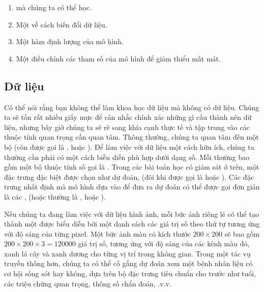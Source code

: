 \documentclass[letterpaper,11pt,english]{sphinxmanual}
\begin{document}
\begin{enumerate}
%
\item {} 
 mà chúng ta có thể học.

\item {} 
Một  về cách biến đổi dữ liệu.

\item {} 
Một hàm  định lượng  của mô hình.

\item {} 
Một  điều chỉnh các tham số của mô hình để giảm thiểu mất
mát.

\end{enumerate}




\subsection{Dữ liệu}
\label{\detokenize{chapter_introduction/index_vn:du-lieu}}


Có thể nói rằng bạn không thể làm khoa học dữ liệu mà không có dữ liệu.
Chúng ta sẽ tốn rất nhiều giấy mực để cân nhắc chính xác những gì cấu
thành nên dữ liệu, nhưng bây giờ chúng ta sẽ rẽ sang khía cạnh thực tế
và tập trung vào các thuộc tính quan trọng cần quan tâm. Thông thường,
chúng ta quan tâm đến một bộ  (còn được gọi là ,  hoặc ). Để làm việc với dữ liệu một cách hữu ích, chúng
ta thường cần phải có một cách biễu diễn phù hợp dưới dạng số. Mỗi  thường bao gồm một bộ thuộc tính số gọi là . Trong các
bài toán học có giám sát ở trên, một đặc trưng đặc biệt được chọn như
 dự đoán, (đôi khi được gọi là  hoặc ).
Các đặc trưng nhất định mà mô hình dựa vào để đưa ra dự đoán có thể được
gọi đơn giản là các , (hoặc thường là , 
hoặc ).



Nếu chúng ta đang làm việc với dữ liệu hình ảnh, mỗi bức ảnh riêng lẻ có
thể tạo thành một  được biểu diễn bởi một danh sách các giá trị số
theo thứ tự tương ứng với độ sáng của từng pixel. Một bức ảnh màu có
kích thước \(200\times 200\) sẽ bao gồm
\(200\times200\times3=120000\) giá trị số, tương ứng với độ sáng của
các kênh màu đỏ, xanh lá cây và xanh dương cho từng vị trí trong không
gian. Trong một tác vụ truyền thống hơn, chúng ta có thể cố gắng dự đoán
xem một bệnh nhân liệu có cơ hội sống sót hay không, dựa trên bộ đặc
trưng tiêu chuẩn cho trước như tuổi, các triệu chứng quan trọng, thông
số chẩn đoán, .v.v.
\end{document}
